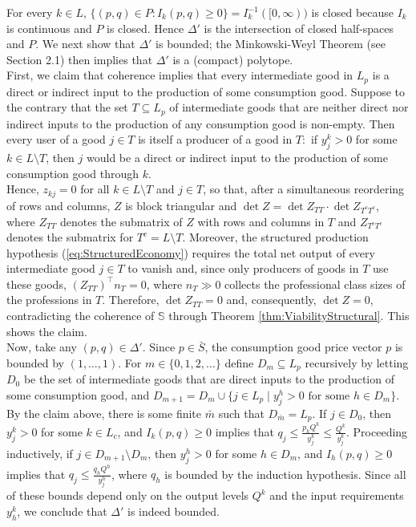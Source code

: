 \documentclass[11pt,fleqn]{article}
\begin{document}
\noindent	For every \(k\in L\), $\{(p,q)\in P:I_k(p,q)\geqslant 0\}	=I_k^{-1}([0,\infty))$
		is closed because \(I_k\) is continuous and $P$ is closed. Hence \(\Delta'\) is  the intersection of closed 	half-spaces and $P$.  
	We next show that $\Delta'$ is bounded; the Minkowski-Weyl Theorem (see Section 2.1) then implies that $\Delta'$ is a (compact) polytope. \\
	First, we claim that coherence implies that every intermediate good in $L_p$ is a direct or indirect input to the production of some consumption good. Suppose to the contrary that the set $T \subseteq L_p$ of intermediate goods that are neither direct nor indirect inputs to the production of any consumption good is non-empty. Then every user of a good $j \in T$ is itself a producer of a good in $T \colon$ if $y^k_j >0$ for some $k \in L \setminus T$, then $j$ would be a direct or indirect input to the production of some consumption good through $k$. \\
	Hence, $z_{kj} =0$ for all $k \in L \setminus T$ and $j \in T$, so that, after a simultaneous reordering of rows and columns, $Z$ is block triangular and $\det Z = \det Z_{TT} \cdot \det Z_{T^cT^c}$, where $Z_{TT}$ denotes the submatrix of $Z$ with rows and columns in $T$ and $Z_{T^cT^c}$ denotes the submatrix for $T^c = L \setminus T$. Moreover, the structured production hypothesis (\ref{eq:StructuredEconomy}) requires the total net output of every intermediate good $j \in T$ to vanish and, since only producers of goods in $T$ use these goods, $\left( Z_{TT} \right)^\top n_T =0$, where $n_T \gg 0$ collects the professional class sizes of the professions in $T$. Therefore, $\det Z_{TT} =0$ and, consequently, $\det Z =0$, contradicting the coherence of $\mathbb S$ through Theorem \ref{thm:ViabilityStructural}. This shows the claim. \\
	Now, take any $(p,q) \in \Delta'$. Since $p \in \bar S$, the consumption good price vector $p$ is bounded by $(1, \ldots ,1)$. For $m \in \{ 0,1,2, \ldots \}$ define $D_m \subseteq L_p$ recursively by letting $D_0$ be the set of intermediate goods that are direct inputs to the production of some consumption good, and $D_{m+1} = D_m \cup \{ j \in L_p \mid y^h_j >0 \mbox{ for some } h \in D_m \}$. By the claim above, there is some finite $\bar m$ such that $D_{\bar m} = L_p$. If $j \in D_0$, then $y^k_j >0$ for some $k \in L_c$, and $I_k (p,q) \geqslant 0$ implies that $q_j \leqslant \tfrac{p_k Q^k}{y^k_j} \leqslant \tfrac{Q^k}{y^k_j}$. Proceeding inductively, if $j \in D_{m+1} \setminus D_m$, then $y^h_j >0$ for some $h \in D_m$, and $I_h (p,q) \geqslant 0$ implies that $q_j \leqslant \tfrac{q_h Q^h}{y^h_j}$, where $q_h$ is bounded by the induction hypothesis. Since all of these bounds depend only on the output levels $Q^k$ and the input requirements $y^k_h$, we conclude that $\Delta'$ is indeed bounded. 
	
\end{document}
